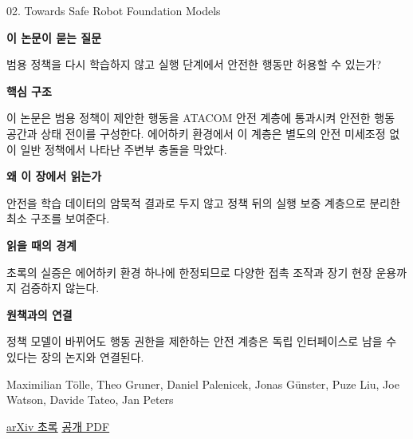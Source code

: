 \documentclass[11pt,openany]{book}
\begin{document}
\begin{termcard}{02. Towards Safe Robot Foundation Models}

\par

\medskip

{\sffamily\bfseries\color{deepblue} 이 논문이 묻는 질문}\par

범용 정책을 다시 학습하지 않고 실행 단계에서 안전한 행동만 허용할 수 있는가?

\smallskip

{\sffamily\bfseries\color{deepblue} 핵심 구조}\par

이 논문은 범용 정책이 제안한 행동을 ATACOM 안전 계층에 통과시켜 안전한 행동 공간과 상태 전이를 구성한다. 에어하키 환경에서 이 계층은 별도의 안전 미세조정 없이 일반 정책에서 나타난 주변부 충돌을 막았다.

\smallskip

{\sffamily\bfseries\color{deepblue} 왜 이 장에서 읽는가}\par

안전을 학습 데이터의 암묵적 결과로 두지 않고 정책 뒤의 실행 보증 계층으로 분리한 최소 구조를 보여준다.

\smallskip

{\sffamily\bfseries\color{coral} 읽을 때의 경계}\par

초록의 실증은 에어하키 환경 하나에 한정되므로 다양한 접촉 조작과 장기 현장 운용까지 검증하지 않는다.

\smallskip

{\sffamily\bfseries\color{teal} 원책과의 연결}\par

정책 모델이 바뀌어도 행동 권한을 제한하는 안전 계층은 독립 인터페이스로 남을 수 있다는 장의 논지와 연결된다.

\medskip

{\footnotesize\color{muted} Maximilian Tölle, Theo Gruner, Daniel Palenicek, Jonas Günster, Puze Liu, Joe Watson, Davide Tateo, Jan Peters\par

\href{https://arxiv.org/abs/2503.07404}{arXiv 초록} \quad \href{https://arxiv.org/pdf/2503.07404}{공개 PDF}\par}

\end{termcard}
\end{document}
